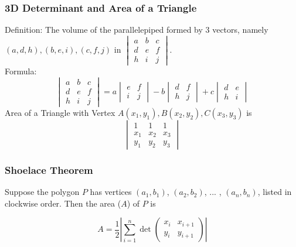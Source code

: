\documentclass{article}
\begin{document}
\subsubsection{3D Determinant and Area of a Triangle}
Definition:
The volume of the parallelepiped formed by 3 vectors, namely $(a,d,h), (b,e,i), (c,f,j)$ in 
$
\begin{vmatrix}
    a & b & c\\
    d & e & f\\
    h & i & j
\end{vmatrix}.
$\\
Formula:
$$
\begin{vmatrix}
    a & b & c\\
    d & e & f\\
    h & i & j
\end{vmatrix}
=a
\begin{vmatrix}
   e  & f\\
   i  & j
\end{vmatrix}
-b
\begin{vmatrix}
   d  & f\\
   h  & j
\end{vmatrix}
+c
\begin{vmatrix}
   d  & e\\
   h  & i
\end{vmatrix}
$$
Area of a Triangle with Vertex $A(x_1,y_1), B(x_2,y_2), C(x_3,y_3)$ is 
$$
\begin{vmatrix}
    1 & 1 & 1\\
    x_1 & x_2 & x_3\\
    y_1 & y_2 & y_3
\end{vmatrix}
$$
\subsubsection{Shoelace Theorem}

Suppose the polygon $P$ has vertices $(a_1, b_1)$, $(a_2, b_2)$, ... , $(a_n, b_n)$, listed in clockwise order. Then the area ($A$) of $P$ is

\[A = \dfrac{1}{2} \left|\sum_{i=1}^n{\det\begin{pmatrix}x_i&x_{i+1}\\y_i&y_{i+1}\end{pmatrix}}\right|\]
\end{document}
